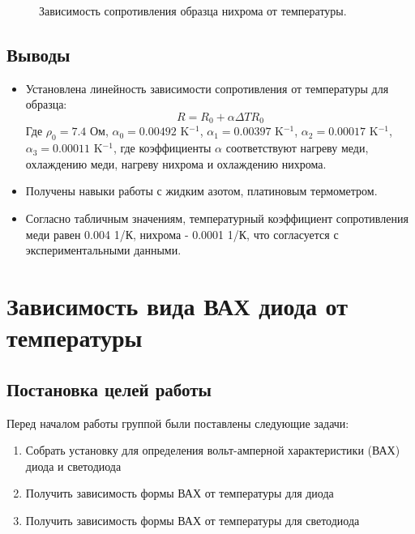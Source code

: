 \documentclass[a4paper, 12pt]{article}
\begin{document}
\begin{figure}[H]
	\centering
	\caption{Зависимость сопротивления образца нихрома от температуры.}
	\label{fig:1_Ni_Heating}
\end{figure}

\subsection{Выводы}

\begin{itemize}
	\item Установлена линейность зависимости сопротивления от температуры для образца: $$ R=R_0 +\alpha\Delta T R_0$$
	Где $\rho_0= 7.4$ Ом, $\alpha_0=0.00492$ K$^{-1}$, $ \alpha_1 =0.00397$ K$^{-1}$, $\alpha_2 =0.00017$ K$^{-1}$, $\alpha_3 =0.00011$ K$^{-1}$, где коэффициенты $\alpha$ соответствуют нагреву меди, охлаждению меди, нагреву нихрома и охлаждению нихрома.
	
	\item Получены навыки работы с жидким азотом, платиновым термометром.
	
	\item Согласно табличным значениям, температурный коэффициент сопротивления меди равен 0.004 1/К, нихрома - 0.0001 1/К, что согласуется с экспериментальными данными.
\end{itemize}

\newpage

\section{Зависимость вида ВАХ диода от температуры}

\subsection{Постановка целей работы}

Перед началом работы группой были поставлены следующие задачи:

\begin{enumerate}
	\item Собрать установку для определения вольт-амперной характеристики (ВАХ) диода и светодиода
	
	\item Получить зависимость формы ВАХ от температуры для диода
	
	\item Получить зависимость формы ВАХ от температуры для светодиода
\end{enumerate}
\end{document}
